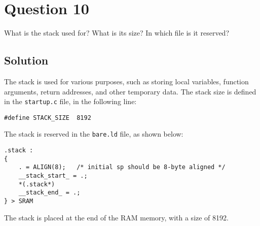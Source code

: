 \section*{Question 10}

What is the stack used for?
What is its size?
In which file is it reserved?

\subsection*{Solution}

The stack is used for various purposes, such as storing local variables, function arguments, return addresses, and other temporary data.
The stack size is defined in the \texttt{startup.c} file, in the following line:
\begin{verbatim}
#define STACK_SIZE  8192
\end{verbatim}
The stack is reserved in the \texttt{bare.ld} file, as shown below:
\begin{verbatim}
.stack :
{
    . = ALIGN(8);   /* initial sp should be 8-byte aligned */
    __stack_start_ = .;
    *(.stack*)
    __stack_end_ = .;
} > SRAM
\end{verbatim}
The stack is placed at the end of the RAM memory, with a size of 8192.
